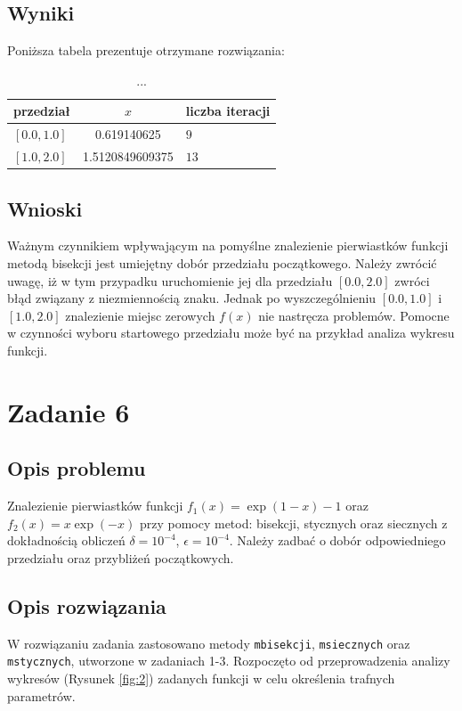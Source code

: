 \documentclass{classrep}
\begin{document}
	\subsection{Wyniki}
		Poniższa tabela prezentuje otrzymane rozwiązania:
		\begin{table}[!hpbt]
        		\centering
        		\footnotesize
			\begin{tabular}{lSl} \toprule
				{przedział} & {$x$} & {liczba iteracji}\\ \midrule
				$[0.0,1.0]$ & 0.619140625 & $9$ \\ 
	 			$[1.0,2.0]$ & 1.5120849609375 & $13$ \\ \bottomrule
	 		\end{tabular}
	 		\caption{...}
			\label{table:2}
		\end{table}	
		
	\subsection{Wnioski}
		Ważnym czynnikiem wpływającym na pomyślne znalezienie pierwiastków funkcji metodą bisekcji jest umiejętny dobór przedziału początkowego. Należy zwrócić uwagę, iż w tym przypadku uruchomienie jej dla przedziału $[0.0,2.0]$ zwróci błąd związany z niezmiennością znaku. Jednak po wyszczególnieniu $[0.0,1.0]$ i $[1.0,2.0]$ znalezienie miejsc zerowych $f(x)$ nie nastręcza problemów. Pomocne w czynności wyboru startowego przedziału może być na przykład analiza wykresu funkcji.
		
\section{Zadanie 6}
	\subsection{Opis problemu}
		Znalezienie pierwiastków funkcji $f_1(x)=\exp(1-x)-1$ oraz $f_2(x)=x\exp(-x)$ przy pomocy metod: bisekcji, stycznych oraz siecznych z dokładnością obliczeń $\delta=10^{-4}$, $\epsilon=10^{-4}$. Należy zadbać o dobór odpowiedniego przedziału oraz przybliżeń początkowych.
		
	\subsection{Opis rozwiązania}
		W rozwiązaniu zadania zastosowano metody \texttt{mbisekcji}, \texttt{msiecznych} oraz \texttt{mstycznych}, utworzone w zadaniach 1-3.
		Rozpoczęto od przeprowadzenia analizy wykresów (Rysunek \ref{fig:2}) zadanych funkcji w celu określenia trafnych parametrów.
		
\end{document}
